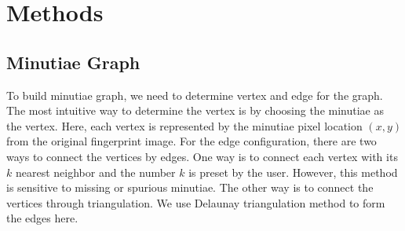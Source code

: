 \section{Methods}
\label{sec:method}

\subsection{Minutiae Graph}
To build minutiae graph, we need to determine vertex and edge for the graph. The most intuitive way to determine the vertex is by choosing the minutiae as the vertex. Here, each vertex is represented by the minutiae pixel location $(x, y)$ from the original fingerprint image. For the edge configuration, there are two ways to connect the vertices by edges. One way is to connect each vertex with its $k$ nearest neighbor and the number $k$ is preset by the user. However, this method is sensitive to missing or spurious minutiae. The other way is to connect the vertices through triangulation. We use Delaunay triangulation method to form the edges here.




